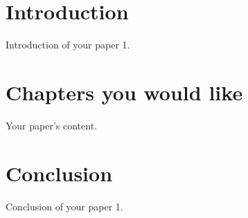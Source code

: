 
\section{Introduction}

Introduction of your paper 1.

\section{Chapters you would like}

Your paper's content.

\section{Conclusion}

Conclusion of your paper 1.